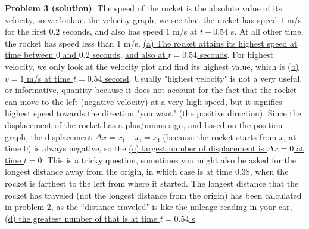 \documentclass[11pt]{article}
\begin{document}
\textbf{Problem 3 (solution)}: The speed of the rocket is the absolute value of its velocity, so we look at the velocity graph, we see that the rocket has speed $1$ m/s for the first $0.2$ seconds, and also has speed $1$ m/s at $t - 0.54$ s. At all other time, the rocket has speed less than $1$ m/s. \underline{(a) The rocket attains its highest speed at time between $0$ and $0.2$ seconds,} \underline{and also at $t=0.54$ seconds}. For highest velocity, we only look at the velocity plot and find its highest value, which is \underline{(b) $v=1$ m/s at time $t=0.54$ second}. Usually "highest velocity" is not a very useful, or informative, quantity because it does not account for the fact that the rocket can move to the left (negative velocity) at a very high speed, but it signifies highest speed towards the direction "you want" (the positive direction). Since the displacement of the rocket has a plus/minus sign, and based on the position graph, the displacement $\Delta x = x_\text{f} - x_{\text{i}} = x_{\text{f}}$ (because the rocket starts from $x_{\text{i}}$ at time $0$) is always negative, so the \underline{(c) largest number of displacement is $\Delta x = 0$ at time $t = 0$}. This is a tricky question, sometimes you might also be asked for the longest distance away from the origin, in which case is at time $0.38$, when the rocket is farthest to the left from where it started. The longest distance that the rocket has traveled (not the longest distance from the origin) has been calculated in problem 2, as the ``distance traveled" is like the mileage reading in your car, \underline{(d) the greatest number of that is at time $t=0.54$ s}. 



\end{document}
